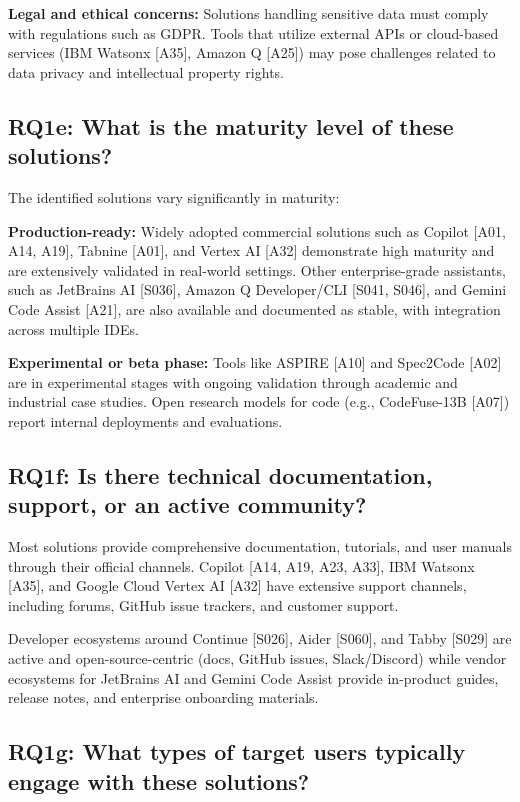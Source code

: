 \textbf{Legal and ethical concerns:} Solutions handling sensitive data must comply with regulations such as GDPR. Tools that utilize external APIs or cloud-based services (IBM Watsonx [A35], Amazon Q [A25]) may pose challenges related to data privacy and intellectual property rights.

\subsection{RQ1e: What is the maturity level of these solutions?}

The identified solutions vary significantly in maturity:

\textbf{Production-ready:} Widely adopted commercial solutions such as Copilot [A01, A14, A19], Tabnine [A01], and Vertex AI [A32] demonstrate high maturity and are extensively validated in real-world settings. Other enterprise-grade assistants, such as JetBrains AI [S036], Amazon Q Developer/CLI [S041, S046], and Gemini Code Assist [A21], are also available and documented as stable, with integration across multiple IDEs.

\textbf{Experimental or beta phase:} Tools like ASPIRE [A10] and Spec2Code [A02] are in experimental stages with ongoing validation through academic and industrial case studies. Open research models for code (e.g., CodeFuse-13B [A07]) report internal deployments and evaluations.

\subsection{RQ1f: Is there technical documentation, support, or an active community?}

Most solutions provide comprehensive documentation, tutorials, and user manuals through their official channels. Copilot [A14, A19, A23, A33], IBM Watsonx [A35], and Google Cloud Vertex AI [A32] have extensive support channels, including forums, GitHub issue trackers, and customer support. 

Developer ecosystems around Continue [S026], Aider [S060], and Tabby [S029] are active and open-source-centric (docs, GitHub issues, Slack/Discord) while vendor ecosystems for JetBrains AI and Gemini Code Assist provide in-product guides, release notes, and enterprise onboarding materials.

\subsection{RQ1g: What types of target users typically engage with these solutions?}

